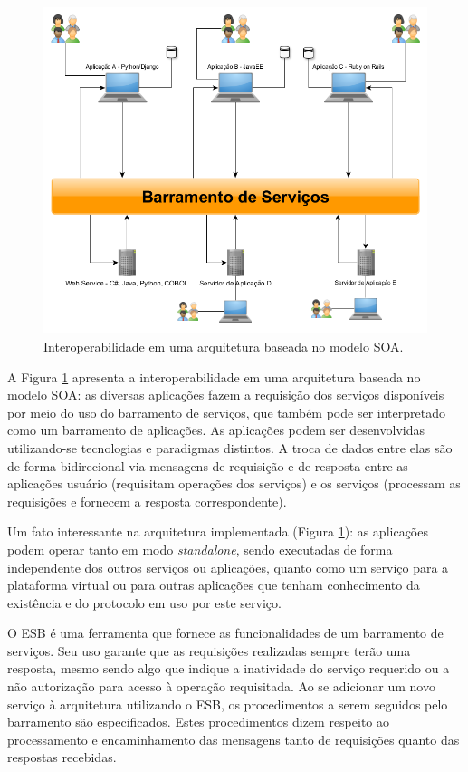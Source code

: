 \begin{figure}[!hbt]
\centering
\includegraphics[scale=0.4]{figuras/barramento_interoperabilidade.png}
\caption{Interoperabilidade em uma arquitetura baseada no modelo SOA.}
\label{barramento_interoperabilidade}
\end{figure}

A Figura \ref{barramento_interoperabilidade} apresenta a interoperabilidade em uma arquitetura baseada no modelo SOA:  as diversas aplicações fazem a requisição dos serviços disponíveis por meio do uso do barramento de serviços, que também pode ser interpretado como um barramento de aplicações. As aplicações podem ser desenvolvidas utilizando-se tecnologias e paradigmas distintos. A troca de dados entre elas são de forma bidirecional via mensagens de requisição e de resposta entre as aplicações usuário (requisitam operações dos serviços) e os serviços (processam as requisições e fornecem a resposta correspondente).

Um fato interessante na arquitetura implementada (Figura \ref{barramento_interoperabilidade}): as aplicações podem operar tanto em modo \textit{standalone}, sendo executadas de forma independente dos outros serviços ou aplicações, quanto como um serviço para a plataforma virtual ou para outras aplicações que tenham conhecimento da existência e do protocolo em uso por este serviço.

O ESB é uma ferramenta que fornece as funcionalidades de um barramento de serviços. Seu uso garante que as requisições realizadas sempre terão uma resposta, mesmo sendo algo que indique a inatividade do serviço requerido ou a não autorização para acesso à operação requisitada. Ao se adicionar um novo serviço à arquitetura utilizando o ESB, os procedimentos a serem seguidos pelo barramento são especificados. Estes procedimentos dizem respeito ao processamento e encaminhamento das mensagens tanto de requisições quanto das respostas recebidas.

